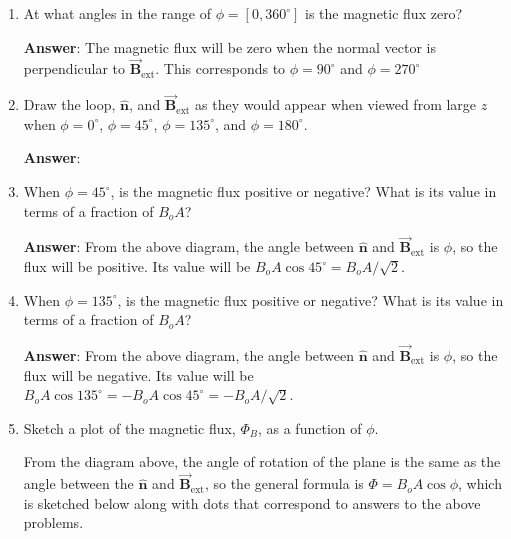 \documentclass{article}
\newcommand{\bfvec}[1]{\vec{\mathbf{#1}}}
\begin{document}
\begin{enumerate}

  \item At what angles in the range of $\phi=[0,360^\circ]$ is the magnetic flux zero?

        \ifsolutions
        {\bf Answer}: The magnetic flux will be zero when the normal vector is perpendicular to  $\bfvec{B}_{\text{ext}}$. This corresponds to $\phi = 90^\circ$ and $\phi = 270^\circ$
        \else
        \vskip 36pt
        \fi

  \item Draw the loop, $\hat{\mathbf{n}}$, and $\bfvec{B}_{\text{ext}}$ as they would appear when viewed from large $z$ when $\phi=0^\circ$, $\phi=45^\circ$, $\phi=135^\circ$, and $\phi=180^\circ$.

        \ifsolutions
        \textbf{Answer}:

        
        \else
        \vskip 144pt
        \fi

  \item When $\phi=45^\circ$, is the magnetic flux positive or negative? What is its value in terms of a fraction of $B_oA$?

        \ifsolutions
        \textbf{Answer}: From the above diagram, the angle between $\hat{\mathbf{n}}$ and $\bfvec{B}_{\text{ext}}$ is $\phi$, so the flux will be positive. Its value will be $B_oA\cos 45^\circ=B_oA/\sqrt{2}$.
        \else
        \vskip 36pt
        \fi

  \item When $\phi=135^\circ$, is the magnetic flux positive or negative? What is its value in terms of a fraction of $B_oA$?

        \ifsolutions
        \textbf{Answer}: From the above diagram, the angle between $\hat{\mathbf{n}}$ and $\bfvec{B}_{\text{ext}}$ is $\phi$, so the flux will be negative. Its value will be $B_oA\cos 135^\circ=-B_oA\cos 45^\circ=-B_oA/\sqrt{2}$.
        \else
        \vskip 36pt
        \fi

  \item Sketch a plot of the magnetic flux, $\Phi_B$, as a function of $\phi$.

        \ifsolutions
        From the diagram above, the angle of rotation of the plane is the same as the angle between the  $\hat{\mathbf{n}}$ and $\bfvec{B}_{\text{ext}}$, so the general formula is $\Phi=B_oA\cos\phi$, which is sketched below along with dots that correspond to answers to the above problems.

        
        \else
        \vskip 60pt
        \fi

\end{enumerate}
\end{document}
